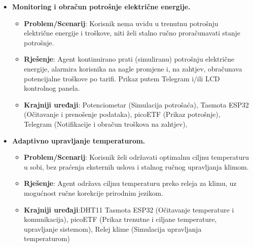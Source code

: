 \documentclass[11pt,a4paper]{article}
\begin{document}
\begin{itemize}[nosep]
\begin{itemize}
            \end{itemize}
      \item \textbf{Monitoring i obračun potrošnje električne energije.}
            \begin{itemize}
                  \item \textbf{Problem/Scenarij}: Korisnik nema uvidu u trenutnu potrošnju električne energije i troškove, niti želi stalno ručno proračunavati stanje potrošnje.
                  \item \textbf{Rješenje}: Agent kontinuirano prati (simuliranu) potrošnju električne energije, alarmira korisnika na nagle promjene i, na zahtjev, obračunava potencijalne troškove po tarifi. Prikaz putem Telegram i/ili LCD kontrolnog panela.
                  \item \textbf{Krajniji uređaji}: Potenciometar (Simulacija potrošaća), Tasmota ESP32 (Očitavanje i prenošenje podataka), picoETF (Prikaz potrošnje), Telegram (Notifikacije i obračun troškova na zahtjev),
            \end{itemize}
      \item \textbf{Adaptivno upravljanje temperaturom.}
            \begin{itemize}
                  \item \textbf{Problem/Scenarij}: Korisnik želi održavati optimalnu ciljnu temperaturu u sobi, bez praćenja eksternih uslova i stalnog ručnog upravljanja klimom.
                  \item \textbf{Rješenje}: Agent održava ciljnu temperaturu preko releja za klimu, uz mogućnost ručne korekcije prirodnim jezikom.
                  \item \textbf{Krajniji uređaji}:DHT11 Tasmota ESP32 (Očitavanje temperature i komunikacija), picoETF (Prikaz trenutne i ciljane temperature, upravljanje sistemom), Relej klime (Simulacija upravljanja temperaturom)
            \end{itemize}


\end{itemize}
\end{document}
